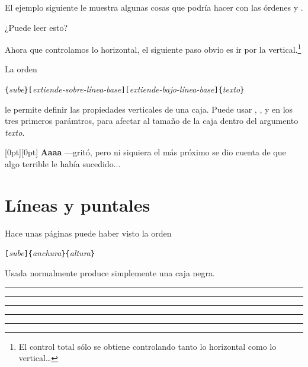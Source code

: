 El ejemplo siguiente le muestra algunas cosas que podría hacer con las órdenes  y .

\begin{example}
\par
{}\par
{} \par
{} \par
{} 
¿Puede leer esto?
\end{example}

Ahora que controlamos lo horizontal, el siguiente paso obvio es ir por la vertical.\footnote{El control total sólo se obtiene controlando tanto lo horizontal como lo vertical\ldots}

La orden
\begin{lscommand}
\verb|{|\emph{sube}\verb|}[|\emph{extiende-sobre-línea-base}\verb|][|\emph{extiende-bajo-línea-base}\verb|]{|\emph{texto}\verb|}|
\end{lscommand}
le permite definir las propiedades verticales de una caja. Puede usar , ,  y  en los tres primeros parámtros, para afectar al tamaño de la caja dentro del argumento \emph{texto}.


\begin{example}
\raisebox{0pt}[0pt][0pt]{\Large%
\textbf{Aaaa\raisebox{-0.3ex}{a}%
\raisebox{-0.7ex}{aa}%
\raisebox{-1.2ex}{h}%
\raisebox{-2.2ex}{h}%
\raisebox{-4.5ex}{h}}}
---gritó, pero ni siquiera el más
próximo se dio cuenta de que 
algo terrible le había sucedido...
\end{example}

\section{Líneas y puntales}
\label{sec:rule}

Hace unas páginas puede haber visto la orden

\begin{lscommand}
\verb|[|\emph{sube}\verb|]{|\emph{anchura}\verb|}{|\emph{altura}\verb|}|
\end{lscommand}

Usada normalmente produce simplemente una caja negra.

\begin{example}
\rule{3mm}{.1pt}%
\rule[-1mm]{5mm}{1cm}%
\rule{3mm}{.1pt}%
\rule[1mm]{1cm}{5mm}%
\rule{3mm}{.1pt}
\end{example}

